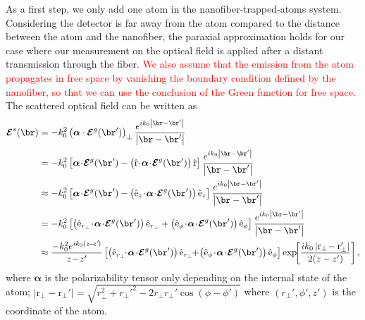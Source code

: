 \documentclass[]{report}
\begin{document}
As a first step, we only add one atom in the nanofiber-trapped-atoms system. 
Considering the detector is far away from the atom compared to the distance between the atom and the nanofiber, the paraxial approximation holds for our case where our measurement on the optical field is applied after a distant transmission through the fiber. \textcolor{red}{We also assume that the emission from the atom propagates in free space by vanishing the boundary condition defined by the nanofiber, so that we can use the conclusion of the Green function for free space. }
The scattered optical field can be written as 
\begin{align}
\boldsymbol{\mathcal{E}}^s(\br) &=-k_0^2\left(\boldsymbol{\alpha}\cdot \boldsymbol{\mathcal{E}}^g(\br')\right)_\perp \frac{e^{ik_0 \left| \br-\br' \right| }}{\left| \br-\br'\right| }\\
&=-k_0^2\left[ \boldsymbol{\alpha}\!\cdot\! \boldsymbol{\mathcal{E}}^g(\br') - \left(\hat{\mathrm{r}}\! \cdot\! \boldsymbol{\alpha}\!\cdot\! \boldsymbol{\mathcal{E}}^g(\br') \right) \hat{\mathrm{r}}\right] \frac{e^{ik_0 \left| \br-\br' \right| }}{\left| \br-\br'\right| }\\
&\approx -k_0^2\left[ \boldsymbol{\alpha}\!\cdot\! \boldsymbol{\mathcal{E}}^g(\br') - \left(\hat{\mathrm{e}}_z\! \cdot\! \boldsymbol{\alpha}\!\cdot\! \boldsymbol{\mathcal{E}}^g(\br') \right) \hat{\mathrm{e}}_z\right] \frac{e^{ik_0 \left| \br-\br' \right| }}{\left| \br-\br'\right| }\\
&=-k_0^2 \left[\left(\hat{\mathrm{e}}_{r_\perp} \! \cdot \! \boldsymbol{\alpha} \! \cdot\! \boldsymbol{\mathcal{E}}^g(\br')\right)\hat{\mathrm{e}}_{r_\perp} + \left(\hat{\mathrm{e}}_\phi \! \cdot \! \boldsymbol{\alpha} \! \cdot \! \boldsymbol{\mathcal{E}}^g(\br') \right)\hat{\mathrm{e}}_\phi \right] 
\frac{e^{ik_0 \left| \br-\br' \right| }}{\left| \br-\br'\right| }\\
&\approx \frac{-k_0^2 e^{ik_0(z\!-\!z'\!)}}{z\!-\!z'}\left[\left(\hat{\mathrm{e}}_{r_\perp} \!\!\cdot\! \boldsymbol{\alpha}\!\cdot\! \boldsymbol{\mathcal{E}}^g(\br')\right)\hat{\mathrm{e}}_{r_\perp} \!\! +\! \left(\hat{\mathrm{e}}_\phi\!\cdot\! \boldsymbol{\alpha}\!\cdot\! \boldsymbol{\mathcal{E}}^g(\br') \right)\hat{\mathrm{e}}_\phi \right] \exp\!\! \left[ \frac{ik_0 \left| \mathrm{r}_\perp\! - \mathrm{r}_\perp'\right|}{2(z-z')}  \right],\label{Erscatt}
\end{align}
where $ \boldsymbol{\alpha} $ is the polarizability tensor only depending on the internal state of the atom; $ \left| \mathrm{r}_\perp - \mathrm{r}_\perp'\right|=\sqrt{r_\perp^2+{r_\perp'}^2 - 2 r_\perp r_\perp'\cos(\phi-\phi')} $ where $ (r_\perp',\phi',z') $ is the coordinate of the atom. 
\end{document}
